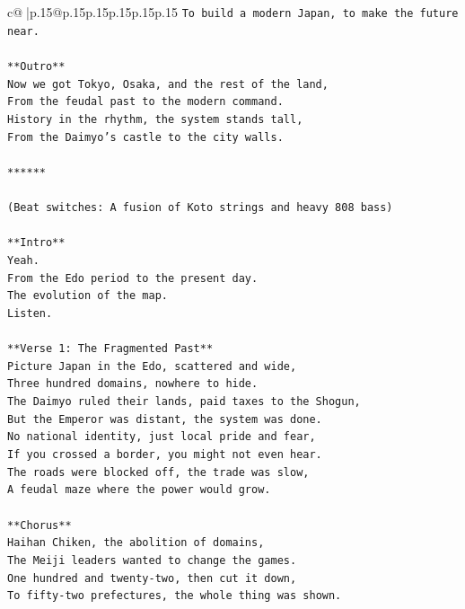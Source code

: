 \documentclass{article}
\begin{document}
{\begin{supertabular}{c@{$\;$}|p{.15\linewidth}@{}p{.15\linewidth}p{.15\linewidth}p{.15\linewidth}p{.15\linewidth}p{.15\linewidth}}
{{{\texttt{To build a modern Japan, to make the future near.} \\
\\ 
\texttt{**Outro**} \\
\texttt{Now we got Tokyo, Osaka, and the rest of the land,} \\
\texttt{From the feudal past to the modern command.} \\
\texttt{History in the rhythm, the system stands tall,} \\
\texttt{From the Daimyo's castle to the city walls.} \\
\\ 
\texttt{******} \\
\\ 
\texttt{(Beat switches: A fusion of Koto strings and heavy 808 bass)} \\
\\ 
\texttt{**Intro**} \\
\texttt{Yeah.} \\
\texttt{From the Edo period to the present day.} \\
\texttt{The evolution of the map.} \\
\texttt{Listen.} \\
\\ 
\texttt{**Verse 1: The Fragmented Past**} \\
\texttt{Picture Japan in the Edo, scattered and wide,} \\
\texttt{Three hundred domains, nowhere to hide.} \\
\texttt{The Daimyo ruled their lands, paid taxes to the Shogun,} \\
\texttt{But the Emperor was distant, the system was done.} \\
\texttt{No national identity, just local pride and fear,} \\
\texttt{If you crossed a border, you might not even hear.} \\
\texttt{The roads were blocked off, the trade was slow,} \\
\texttt{A feudal maze where the power would grow.} \\
\\ 
\texttt{**Chorus**} \\
\texttt{Haihan Chiken, the abolition of domains,} \\
\texttt{The Meiji leaders wanted to change the games.} \\
\texttt{One hundred and twenty{-}two, then cut it down,} \\
\texttt{To fifty{-}two prefectures, the whole thing was shown.} \\
}}}
\end{supertabular}}
\end{document}
